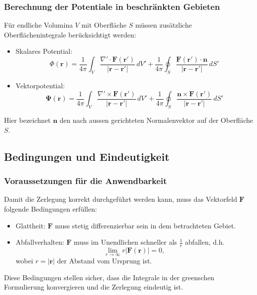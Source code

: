 \subsubsection{Berechnung der Potentiale in beschränkten Gebieten}

Für endliche Volumina $V$ mit Oberfläche $S$ müssen zusätzliche
Oberflächenintegrale berücksichtigt werden:

\begin{itemize}
\item Skalares Potential:
\begin{equation}
\Phi (\boldsymbol{r})
=
\frac{1}{4\pi}
\int_V
\frac{\nabla' \cdot \boldsymbol{F}(\boldsymbol{r}')}{|\boldsymbol{r} - \boldsymbol{r}'|}
\,dV'
+
\frac{1}{4\pi}
\oint_S \frac{\boldsymbol{F}(\boldsymbol{r}') \cdot \boldsymbol{n}}{|\boldsymbol{r} - \boldsymbol{r}'|}
\,dS'
\end{equation}

\item Vektorpotential:
\begin{equation}
\boldsymbol{\Psi}(\boldsymbol{r})
=
\frac{1}{4\pi}
\int_V
\frac{\nabla' \times \boldsymbol{F}(\boldsymbol{r}')}{|\boldsymbol{r} - \boldsymbol{r}'|}
\,dV'
+
\frac{1}{4\pi}
\oint_S
\frac{\boldsymbol{n} \times \boldsymbol{F}(\boldsymbol{r}')}{|\boldsymbol{r} - \boldsymbol{r}'|}
\,dS'
\end{equation}
\end{itemize}
Hier bezeichnet $\boldsymbol{n}$ den nach aussen gerichteten
Normalenvektor auf der Oberfläche $S$.

\subsection{Bedingungen und Eindeutigkeit
\label{helmholtz:subsection:Bedingungen_Eindeutigkeit}}

\subsubsection{Voraussetzungen für die Anwendbarkeit}
Damit die Zerlegung korrekt durchgeführt werden kann, muss das
Vektorfeld $\boldsymbol{F}$ folgende Bedingungen erfüllen:

\begin{itemize}
\item Glattheit: $\boldsymbol{F}$ muss stetig differenzierbar sein
in dem betrachteten Gebiet.
\item Abfallverhalten: $\boldsymbol{F}$ muss im Unendlichen schneller
als $\frac{1}{r}$ abfallen, d.h.
\begin{equation}
\lim_{r \to \infty} r|\boldsymbol{F}(\boldsymbol{r})| = 0,
\end{equation}
wobei $r = |\boldsymbol{r}|$ der Abstand vom Ursprung ist.
\end{itemize}
Diese Bedingungen stellen sicher, dass die Integrale in der greenschen
Formulierung konvergieren und die Zerlegung eindeutig ist.

